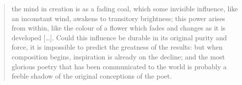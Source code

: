 \begin{paper}
\begin{quote}
the mind in creation is as a fading coal, which some invisible
influence, like an inconstant wind, awakens to transitory brightness;
this power arises from within, like the colour of a flower which fades
and changes as it is developed [\ldots{}]. Could this influence be
durable in its original purity and force, it is impossible to predict
the greatness of the results: but when composition begins, inspiration
is already on the decline; and the most glorious poetry that has been
communicated to the world is probably a feeble shadow of the original
conceptions of the poet. 
\begin{flushright}
\citep[505]{shelley_shelleys_1977}
\end{flushright}
\end{quote}


\end{paper}
